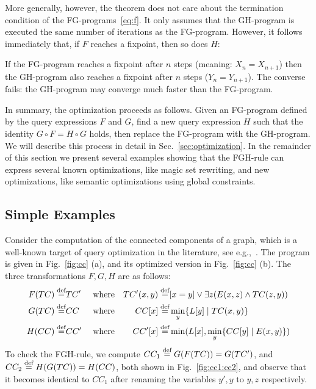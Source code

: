 More generally, however, the theorem does not care about the
termination condition of the FG-programs~\eqref{eq:f}. It only assumes
that the GH-program is executed the same number of iterations as the
FG-program.  However, it follows immediately that, if $F$ reaches a
fixpoint, then so does $H$:

\begin{corollary} \label{cor:number:iterations}
  If the FG-program reaches a fixpoint after $n$ steps (meaning:
  $X_n=X_{n+1}$) then the GH-program also reaches a fixpoint after $n$
  steps ($Y_n = Y_{n+1}$).  The converse fails: the GH-program may
  converge much faster than the FG-program.
\end{corollary}



In summary, the optimization proceeds as follows.  Given an FG-program
defined by the query expressions $F$ and $G$, find a new query
expression $H$ such that the identity $G\circ F = H \circ G$ holds,
then replace the FG-program with the GH-program.  We will describe
this process in detail in Sec.~\ref{sec:optimization}.  In the
remainder of this section we present several examples showing that the
FGH-rule can express several known optimizations, like magic set
rewriting, and new optimizations, like semantic optimizations using
global constraints.


\subsection{Simple Examples}

\label{subsec:simple:examples}


\begin{ex}\label{ex:fgh:cc} Consider the
computation of the connected components of a graph, which
is a well-known target of query optimization in the literature, 
see e.g.,~\cite{DBLP:conf/amw/ZanioloYIDSC18}.
%
The program is given in Fig.~\ref{fig:cc} (a), and its optimized version
  in Fig.~\ref{fig:cc} (b).  The three transformations $F,G,H$ are as follows:
%
\begin{align*}
  F(TC) \stackrel{\text{def}}{=} & TC' &&\mbox{ where}&  TC'(x,y) \stackrel{\text{def}}{=} & [x=y] \vee \exists z(E(x,z) \wedge TC(z,y))\\
  G(TC) \stackrel{\text{def}}{=} & CC  &&\mbox{ where}&  CC[x] \stackrel{\text{def}}{=} & \min_y \{{L[y]}\mid{TC(x,y)}\}\\
  H(CC) \stackrel{\text{def}}{=} & CC' &&\mbox{ where}&  CC'[x] \stackrel{\text{def}}{=} & \min(L[x], \min_y \{{CC[y]}\mid{E(x,y)}\})
\end{align*}
%
To check the FGH-rule, we compute $CC_1 \stackrel{\text{def}}{=} G(F(TC)) = G(TC')$,
and
$CC_2 \stackrel{\text{def}}{=} H(G(TC)) = H(CC)$, both shown in Fig.~\ref{fig:cc1:cc2}, and
observe that it becomes identical to $CC_1$ after renaming the
variables $y',y$ to $y,z$ respectively.
\end{ex}


